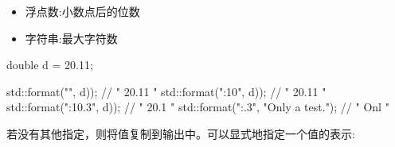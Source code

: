 \begin{itemize}
\begin{itemize}
\item 
浮点数:小数点后的位数

\item 
字符串:最大字符数
\end{itemize}

\begin{cpp}
double d = 20.11;

std::format("{}", d)); // " 20.11 "
std::format("{:10}", d)); // " 20.11 "
std::format("{:10.3}", d)); // " 20.1 "
std::format("{:.3}", "Only a test."); // " Onl "
\end{cpp}

\end{itemize}


若没有其他指定，则将值复制到输出中。可以显式地指定一个值的表示:


